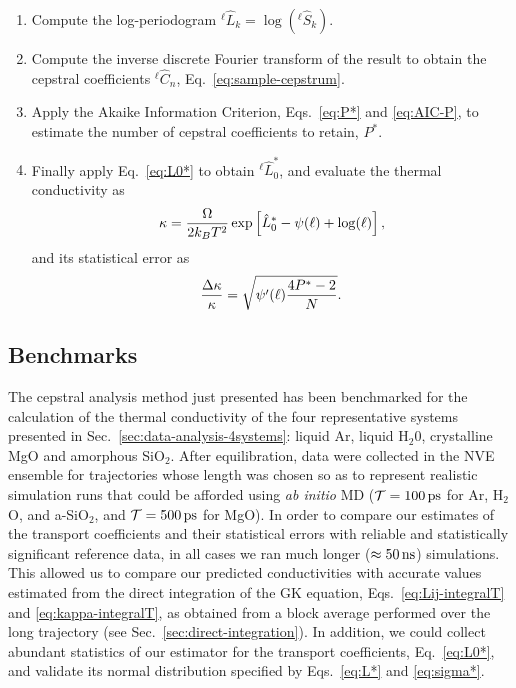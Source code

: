 \begin{enumerate}
    \item Compute the log-periodogram ${^{\ell\!}}\hat{L}_k = \log({^{\ell\!}}\hat{S}_k)$.
    \item Compute the inverse discrete Fourier transform of the result to obtain the cepstral coefficients ${^{\ell\!}}\hat{C}_n$, Eq.~\eqref{eq:sample-cepstrum}. 
    \item Apply the Akaike Information Criterion, Eqs.~\eqref{eq:P*} and \eqref{eq:AIC-P}, to estimate the number of cepstral coefficients to retain, $P^*$.
    \item Finally apply Eq.~\eqref{eq:L0*} to obtain ${^{\ell\!}}\hat{L}_0^*$, and evaluate the thermal conductivity as
    \begin{equation}
        \kappa = \frac{{\mathrm\Omega}}{2k_B T^2} \exp\left[\hat{L}_0^* - \psi(\ell) + \log(\ell) \right],
    \end{equation}
    and its statistical error as
    \begin{equation}
        \frac{{\mathrm\Delta}\kappa}{\kappa} = \sqrt{\psi'(\ell) \frac{4P^{*}-2}{N}}.
    \end{equation}
\end{enumerate}


\subsection{Benchmarks}  \label{sec:cepstral-benchmarks}
The cepstral analysis method just presented has been benchmarked for the calculation of the thermal conductivity of the four representative systems presented in Sec.~\ref{sec:data-analysis-4systems}: liquid Ar, liquid H$_2$0, crystalline MgO and amorphous SiO$_2$.
After equilibration, data were collected in the NVE ensemble for trajectories whose length was chosen so as to represent realistic simulation runs that could be afforded using \emph{ab initio} MD ($\mathcal{T} = 100\,\mathrm{ps}$ for Ar, H$_2$O, and a-SiO$_2$, and $\mathcal{T} =500\,\mathrm{ps}$ for MgO). 
In order to compare our estimates of the transport coefficients and their statistical errors with reliable and statistically significant reference data, in all cases we ran much longer ($\approx 50\,\mathrm{ns}$) simulations. 
This allowed us to compare our predicted conductivities with accurate values estimated from the direct integration of the GK equation, Eqs.~\eqref{eq:Lij-integralT} and \eqref{eq:kappa-integralT}, as obtained from a block average \cite{Frenkel2001} performed over the long trajectory (see Sec.~\ref{sec:direct-integration}). 
In addition, we could collect abundant statistics of our estimator for the transport coefficients, Eq.~\eqref{eq:L0*}, and validate its normal distribution specified by Eqs.~\eqref{eq:L*} and \eqref{eq:sigma*}. 

